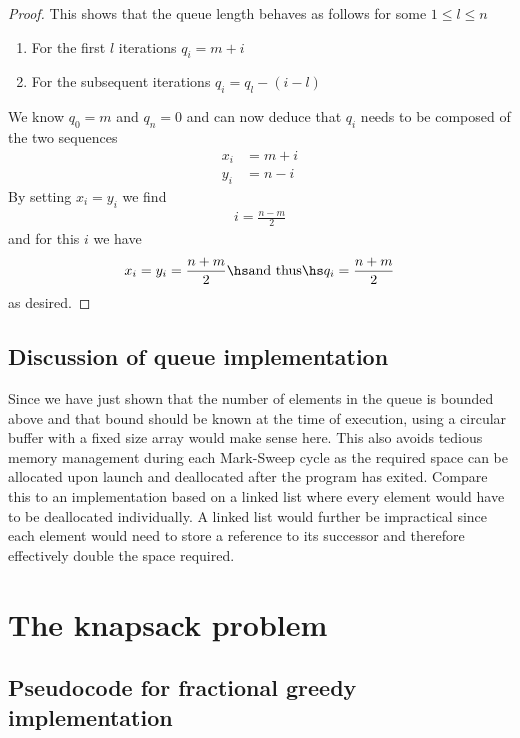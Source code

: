 \documentclass{article}
\begin{document}
\begin{proof}
	This shows that the queue length behaves as follows for some $1\leq l \leq n$
	\begin{enumerate}
		\item For the first $l$ iterations $q_i = m + i$
		\item For the subsequent iterations $q_i = q_l - (i - l)$
	\end{enumerate}
	We know $q_0 = m$ and $q_n=0$ and can now deduce that $q_i$ needs to be composed of
	the two sequences
	\begin{align*}
		x_i & = m + i \\
		y_i & = n - i
	\end{align*}
	By setting $x_i=y_i$ we find
	\begin{align*}
		i = \frac{n-m}{2}
	\end{align*}
	and for this $i$ we have
	\begin{align*}
		x_i = y_i = \frac{n+m}{2}\hs\text{and thus}\hs q_i = \frac{n+m}{2}
	\end{align*}
	as desired.


\end{proof}

\subsection{Discussion of queue implementation}

Since we have just shown that the number of elements in the queue is bounded
above and that bound should be known at the time of execution, using a
circular buffer with a fixed size array would make sense here. This also avoids
tedious memory management during each Mark-Sweep cycle as the required
space can be allocated upon launch and deallocated after the program has exited.
Compare this to an implementation based on a linked list where every element would
have to be deallocated individually. A linked list would further be impractical
since each element would need to store a reference to its successor and therefore
effectively double the space required.


\section{The knapsack problem}


\subsection{Pseudocode for fractional greedy implementation}
\end{document}
